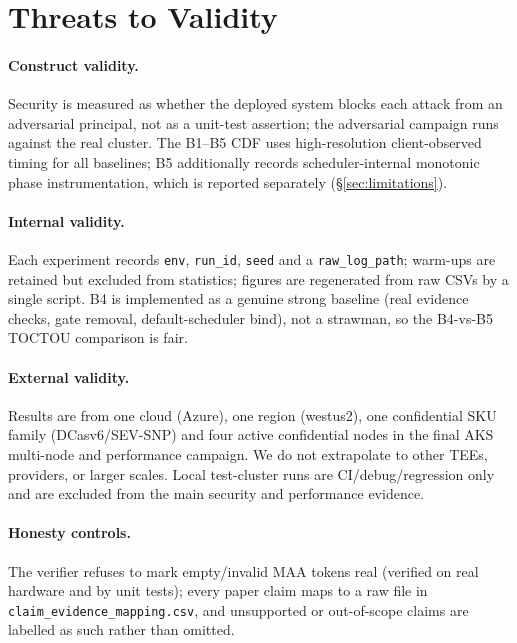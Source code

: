 \section{Threats to Validity}
\label{sec:ttv}

\paragraph{Construct validity.}
Security is measured as whether the deployed system blocks each attack from an
adversarial principal, not as a unit-test assertion; the adversarial campaign
runs against the real cluster. The B1--B5 CDF uses high-resolution
client-observed timing for all baselines; B5 additionally records
scheduler-internal monotonic phase instrumentation, which is reported separately
(\S\ref{sec:limitations}).

\paragraph{Internal validity.}
Each experiment records \texttt{env}, \texttt{run\_id}, \texttt{seed} and a
\texttt{raw\_log\_path}; warm-ups are retained but excluded from statistics;
figures are regenerated from raw CSVs by a single script. B4 is implemented as a
genuine strong baseline (real evidence checks, gate removal, default-scheduler
bind), not a strawman, so the B4-vs-B5 TOCTOU comparison is fair.

\paragraph{External validity.}
Results are from one cloud (Azure), one region (westus2), one confidential SKU
family (DCasv6/SEV-SNP) and four active confidential nodes in the final AKS
multi-node and performance campaign. We do not extrapolate to other TEEs,
providers, or larger scales. Local test-cluster runs are CI/debug/regression
only and are excluded from the main security and performance evidence.

\paragraph{Honesty controls.}
The verifier refuses to mark empty/invalid MAA tokens real (verified on real
hardware and by unit tests); every paper claim maps to a raw file in
\texttt{claim\_evidence\_mapping.csv}, and unsupported or out-of-scope claims are
labelled as such rather than omitted.
